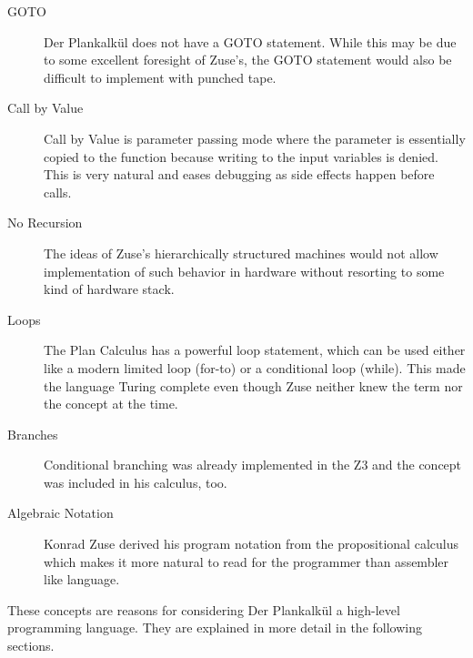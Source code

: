 \documentclass{llncs}
\begin{document}
   \begin{description}
     \item[GOTO] Der Plankalkül does not have 
       a GOTO statement. While this may be due to some excellent
       foresight of Zuse's, the GOTO statement would also be
       difficult to implement with punched tape.
     \item[Call by Value] Call by Value is parameter passing mode 
       where the parameter is essentially copied to the function because
       writing to the input variables is denied. This is very natural 
       and eases debugging as side effects happen before calls.
     \item[No Recursion] 
       The ideas of Zuse's hierarchically structured machines would not 
       allow implementation of such behavior in hardware without resorting 
       to some kind of hardware stack.
     \item[Loops] The Plan Calculus has a powerful loop statement, 
       which can be used either like a modern limited loop (for-to) 
       or a conditional loop (while). This made the language Turing
       complete even though Zuse neither knew the term nor the 
       concept at the time.
     \item[Branches] Conditional branching was already implemented 
       in the Z3 and the concept was included in his calculus, too.
     \item[Algebraic Notation] Konrad Zuse derived his program 
       notation from the propositional calculus which makes
       it more natural to read for the programmer than assembler like 
       language.
   \end{description}
   These concepts are reasons for considering Der Plankalkül a
   high-level programming language. They are explained in more detail 
   in the following sections.
\end{document}
